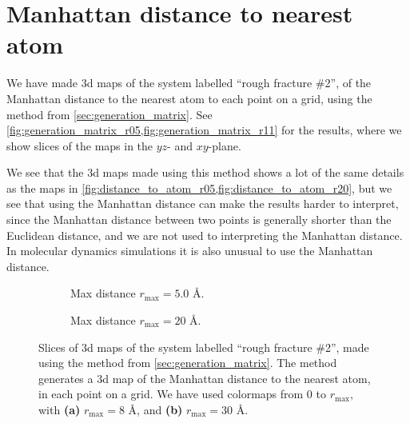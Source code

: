 \section{Manhattan distance to nearest atom}
%
We have made 3d maps of the system labelled ``rough fracture \#2'', of the Manhattan distance to the nearest atom to each point on a grid, using the method from \cref{sec:generation_matrix}. See \cref{fig:generation_matrix_r05,fig:generation_matrix_r11} for the results, where we show slices of the maps in the $yz$- and $xy$-plane.

We see that the 3d maps made using this method shows a lot of the same details as the maps in \cref{fig:distance_to_atom_r05,fig:distance_to_atom_r20}, but we see that using the Manhattan distance can make the results harder to interpret, since the Manhattan distance between two points is generally shorter than the Euclidean distance, and we are not used to interpreting the Manhattan distance. In molecular dynamics simulations it is also unusual to use the Manhattan distance.%
%
\begin{figure}[!p]%
    \centering%
    \setlength{\myfigwidth}{\textwidth}%
    \begin{subfigure}[b]{\myfigwidth}%
        \caption{Max distance $r_\text{max}=5.0$ \AA.%
        \label{fig:generation_matrix_r05}}%
    \end{subfigure}%
    \vspace{10pt}
    \begin{subfigure}[b]{\myfigwidth}%
        \caption{Max distance $r_\text{max}=20$ \AA.%
        \label{fig:generation_matrix_r11}}%
    \end{subfigure}%
    \captionsetup{width=\textwidth}%
    \caption{%
        Slices of 3d maps of the system labelled ``rough fracture \#2'', made using the method from \cref{sec:generation_matrix}. The method generates a 3d map of the Manhattan distance to the nearest atom, in each point on a grid. We have used colormaps from 0 to $r_\text{max}$, with \textbf{(a)} $r_\text{max} = 8$ \AA, and \textbf{(b)} $r_\text{max} = 30$ \AA.%
    }%
\end{figure}%